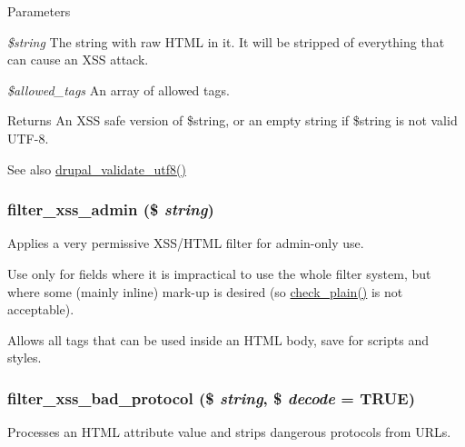 \begin{DoxyParams}{Parameters}
\item[{\em \$string}]The string with raw HTML in it. It will be stripped of everything that can cause an XSS attack. \item[{\em \$allowed\_\-tags}]An array of allowed tags.\end{DoxyParams}
\begin{DoxyReturn}{Returns}
An XSS safe version of \$string, or an empty string if \$string is not valid UTF-\/8.
\end{DoxyReturn}
\begin{DoxySeeAlso}{See also}
\hyperlink{bootstrap_8inc_abf62947a33393477301b0070b1ff0c7a}{drupal\_\-validate\_\-utf8()} 
\end{DoxySeeAlso}
\hypertarget{group__sanitization_ga97dcceb77b76539219af2a85eacbe18d}{
\subsubsection[{filter\_\-xss\_\-admin}]{\setlength{\rightskip}{0pt plus 5cm}filter\_\-xss\_\-admin (\$ {\em string})}}
\label{group__sanitization_ga97dcceb77b76539219af2a85eacbe18d}
Applies a very permissive XSS/HTML filter for admin-\/only use.

Use only for fields where it is impractical to use the whole filter system, but where some (mainly inline) mark-\/up is desired (so \hyperlink{group__sanitization_ga76fc67a30fd8d75ddd80565e6e65a13d}{check\_\-plain()} is not acceptable).

Allows all tags that can be used inside an HTML body, save for scripts and styles. \hypertarget{group__sanitization_ga81affabdadf9d999874d5a69316ec8c8}{
\subsubsection[{filter\_\-xss\_\-bad\_\-protocol}]{\setlength{\rightskip}{0pt plus 5cm}filter\_\-xss\_\-bad\_\-protocol (\$ {\em string}, \/  \$ {\em decode} = {\ttfamily TRUE})}}
\label{group__sanitization_ga81affabdadf9d999874d5a69316ec8c8}
Processes an HTML attribute value and strips dangerous protocols from URLs.


